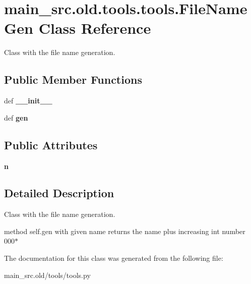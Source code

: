 \hypertarget{classmain__src_8old_1_1tools_1_1tools_1_1FileNameGen}{\section{main\-\_\-src.\-old.\-tools.\-tools.\-File\-Name\-Gen Class Reference}
\label{classmain__src_8old_1_1tools_1_1tools_1_1FileNameGen}
}


Class with the file name generation.  


\subsection*{Public Member Functions}
\begin{DoxyCompactItemize}
\item 
\hypertarget{classmain__src_8old_1_1tools_1_1tools_1_1FileNameGen_a347d48496cc1de0e0d1d239c5997c2e7}{def {\bfseries \-\_\-\-\_\-init\-\_\-\-\_\-}}\label{classmain__src_8old_1_1tools_1_1tools_1_1FileNameGen_a347d48496cc1de0e0d1d239c5997c2e7}

\item 
\hypertarget{classmain__src_8old_1_1tools_1_1tools_1_1FileNameGen_a4735b4b076a25d39689c8ff79d055663}{def {\bfseries gen}}\label{classmain__src_8old_1_1tools_1_1tools_1_1FileNameGen_a4735b4b076a25d39689c8ff79d055663}

\end{DoxyCompactItemize}
\subsection*{Public Attributes}
\begin{DoxyCompactItemize}
\item 
\hypertarget{classmain__src_8old_1_1tools_1_1tools_1_1FileNameGen_aa2ddd6c657d1b808946c18419174678e}{{\bfseries n}}\label{classmain__src_8old_1_1tools_1_1tools_1_1FileNameGen_aa2ddd6c657d1b808946c18419174678e}

\end{DoxyCompactItemize}


\subsection{Detailed Description}
Class with the file name generation. 

method self.\-gen with given name returns the name plus increasing int number 000$\ast$ 

The documentation for this class was generated from the following file\-:\begin{DoxyCompactItemize}
\item 
main\-\_\-src.\-old/tools/tools.\-py\end{DoxyCompactItemize}
